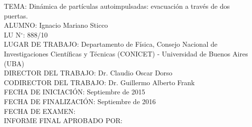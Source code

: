 \begin{flushleft}
TEMA: Dinámica de partículas autoimpulsadas: evacuación a través de dos puertas.\\

ALUMNO: Ignacio Mariano Sticco\\

LU N$^{\circ}$: 888/10 \\

LUGAR DE TRABAJO: Departamento de Física, Consejo Nacional de Investigaciones Cient\'ificas y T\'ecnicas (CONICET) - Universidad de Buenos Aires (UBA)\\

DIRECTOR DEL TRABAJO: Dr. Claudio Oscar Dorso \\

CODIRECTOR DEL TRABAJO: Dr. Guillermo Alberto Frank\\

FECHA DE INICIACI\'ON: Septiembre de 2015 \\

FECHA DE FINALIZACI\'ON: Septiembre de 2016\\

FECHA DE EXAMEN:  \\

INFORME FINAL APROBADO POR:
\end{flushleft}                                                              %
\vspace{2cm}

